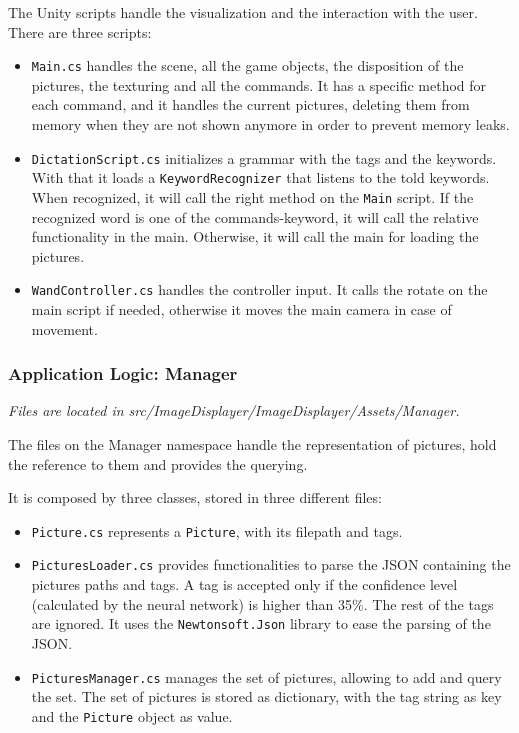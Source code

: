 \documentclass[11pt,a4paper]{article}
\begin{document}
The Unity scripts handle the visualization and the interaction with the user. 
There are three scripts:
\begin{itemize}
\item\texttt{Main.cs} handles the scene, all the game objects, the disposition of the pictures, the texturing and all the commands.
It has a specific method for each command, and it handles the current pictures, deleting them from memory when they are not shown anymore in order to prevent memory leaks.
\item \texttt{DictationScript.cs} initializes a grammar with the tags and the keywords. With that it loads a \texttt{KeywordRecognizer} that listens to the told keywords. When recognized, it will call the right method on the \texttt{Main} script.
If the recognized word is one of the commands-keyword, it will call the relative functionality in the main.
Otherwise, it will call the main for loading the pictures.
\item\texttt{WandController.cs} handles the controller input. It calls the rotate on the main script if needed, otherwise it moves the main camera in case of movement.
\end{itemize}

\subsubsection{Application Logic: Manager}
\textit{Files are located in src/ImageDisplayer/ImageDisplayer/Assets/Manager.}

The files on the Manager namespace handle the representation of pictures, hold the reference to them and provides the querying.

It is composed by three classes, stored in three different files:
\begin{itemize}
\item \texttt{Picture.cs} represents a \texttt{Picture}, with its filepath and tags.
\item \texttt{PicturesLoader.cs} provides functionalities to parse the JSON containing the pictures paths and tags. 
A tag is accepted only if the confidence level (calculated by the neural network) is higher than 35$\%$.
The rest of the tags are ignored.
It uses the \texttt{Newtonsoft.Json} library to ease the parsing of the JSON.
\item \texttt{PicturesManager.cs} manages the set of pictures, allowing to add and query the set. The set of pictures is stored as dictionary, with the tag string as key and the \texttt{Picture} object as value.
\end{itemize}
\end{document}
